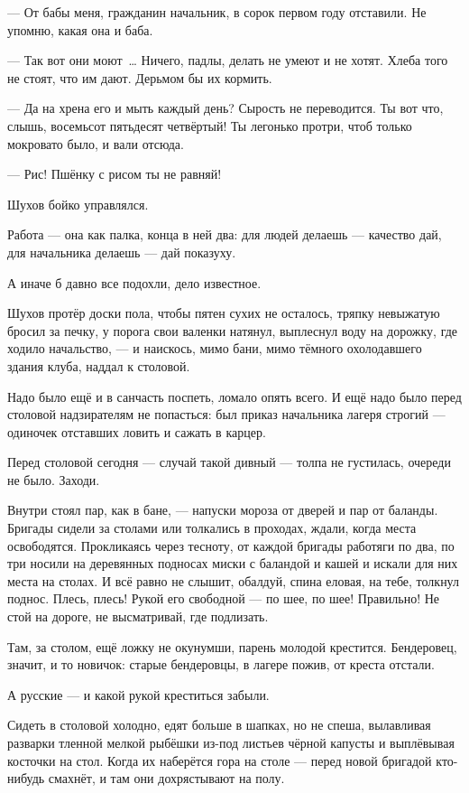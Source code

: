 --- От бабы меня, гражданин начальник, в сорок первом году отставили. Не упомню, какая она и 
баба.

--- Так вот они моют~\dots{} Ничего, падлы, делать не умеют и не хотят. Хлеба того не стоят, что им 
дают. Дерьмом бы их кормить.

--- Да на хрена его и мыть каждый день? Сырость не переводится. Ты вот что, слышь, восемьсот 
пятьдесят четвёртый! Ты легонько протри, чтоб только мокровато было, и вали отсюда.

--- Рис! Пшёнку с рисом ты не равняй!

Шухов бойко управлялся.

Работа --- она как палка, конца в ней два: для людей делаешь --- качество дай, для начальника 
делаешь --- дай показуху.

А иначе б давно все подохли, дело известное.

Шухов протёр доски пола, чтобы пятен сухих не осталось, тряпку невыжатую бросил за печку, у 
порога свои валенки натянул, выплеснул воду на дорожку, где ходило начальство, --- и наискось, 
мимо бани, мимо тёмного охолодавшего здания клуба, наддал к столовой.

Надо было ещё и в санчасть поспеть, ломало опять всего. И ещё надо было перед столовой 
надзирателям не попасться: был приказ начальника лагеря строгий --- одиночек отставших 
ловить и сажать в карцер.

Перед столовой сегодня --- случай такой дивный --- толпа не густилась, очереди не было. Заходи.

Внутри стоял пар, как в бане, --- напуски мороза от дверей и пар от баланды. Бригады сидели за 
столами или толкались в проходах, ждали, когда места освободятся. Прокликаясь через тесноту, 
от каждой бригады работяги по два, по три носили на деревянных подносах миски с баландой и 
кашей и искали для них места на столах. И всё равно не слышит, обалдуй, спина еловая, на тебе, 
толкнул поднос. Плесь, плесь! Рукой его свободной --- по шее, по шее! Правильно! Не стой на 
дороге, не высматривай, где подлизать.

Там, за столом, ещё ложку не окунумши, парень молодой крестится. Бендеровец, значит, и то 
новичок: старые бендеровцы, в лагере пожив, от креста отстали.

А русские --- и какой рукой креститься забыли.

Сидеть в столовой холодно, едят больше в шапках, но не спеша, вылавливая разварки тленной 
мелкой рыбёшки из-под листьев чёрной капусты и выплёвывая косточки на стол. Когда их 
наберётся гора на столе --- перед новой бригадой кто-нибудь смахнёт, и там они дохрястывают на 
полу.

